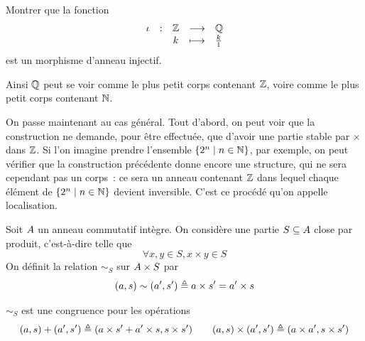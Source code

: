 \begin{exercise}
  Montrer que la fonction
  \[\makeFun{\iota}{\bZ}{\bQ}{k}{\frac{k}{1}}\]
  est un morphisme d'anneau injectif.
\end{exercise}

Ainsi $\mathbb Q$ peut se voir comme le plus petit corps contenant $\mathbb Z$,
voire comme le plus petit corps contenant $\mathbb N$.

On passe maintenant au cas général. Tout d'abord, on peut voir que la
construction ne demande, pour être effectuée, que d'avoir une partie stable
par $\times$ dans $\mathbb Z$. Si l'on imagine prendre l'ensemble
$\left\{ 2^n \;\middle\vert\; n \in \mathbb N \right\}$, par exemple, on peut vérifier que la
construction précédente donne encore une structure, qui ne sera cependant pas
un corps~: ce sera un anneau contenant $\mathbb Z$ dans lequel chaque élément
de $\left\{ 2^n \;\middle\vert\; n \in \mathbb N \right\}$ devient inversible. C'est ce procédé qu'on
appelle localisation.

\begin{definition}[Localisation]
  Soit $A$ un anneau commutatif intègre. On considère une partie
  $S\subseteq A$ close par produit, c'est-à-dire telle que
  \[\forall x,y\in S, x \times y \in S\]
  On définit la relation $\sim_S$ sur $A\times S$ par
  \[(a,s) \sim (a',s') \triangleq a\times s' = a' \times s\]
\end{definition}

\begin{proposition}
  $\sim_S$ est une congruence pour les opérations
  \[(a,s)+(a',s') \triangleq (a\times s' + a' \times s, s\times s')\qquad
  (a,s)\times (a',s') \triangleq (a\times a',s\times s')\]
\end{proposition}

